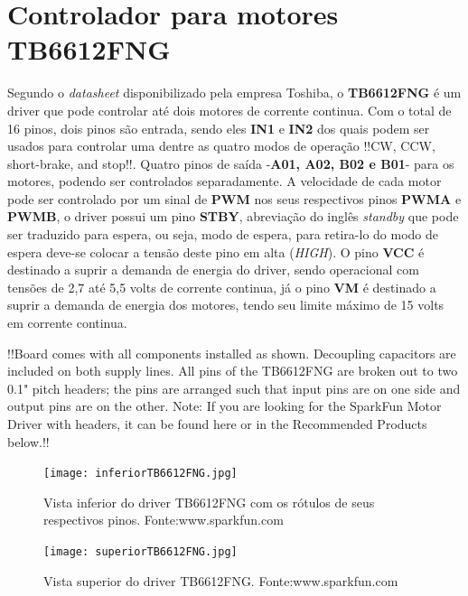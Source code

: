 \documentclass[a4paper,12pt,portuguese]{ufms-cpcx}
\begin{document}
\section{Controlador para motores TB6612FNG}\label{TB6612FNG}
Segundo o \textit{datasheet} disponibilizado pela empresa Toshiba, o \textbf{TB6612FNG} é um driver que pode controlar até dois motores de corrente continua. Com o total de 16 pinos, dois pinos são entrada, sendo eles \textbf{IN1} e \textbf{IN2} dos quais podem ser usados para controlar uma dentre as quatro modos de operação !!CW, CCW, short-brake, and stop!!. Quatro pinos de saída -\textbf{A01, A02, B02 e B01}- para os motores, podendo ser controlados separadamente. A velocidade de cada motor pode ser controlado por um sinal de \textbf{PWM} nos seus respectivos pinos \textbf{PWMA} e \textbf{PWMB}, o driver possui um pino \textbf{STBY}, abreviação do inglês \textit{standby} que pode ser traduzido para espera, ou seja, modo de espera, para retira-lo do modo de espera deve-se colocar a tensão deste pino em alta (\textit{HIGH}). O pino \textbf{VCC} é destinado a suprir a demanda de energia do driver, sendo operacional com tensões de 2,7 até 5,5 volts de corrente continua, já o pino \textbf{VM} é destinado a suprir a demanda de energia dos motores, tendo seu limite máximo de 15 volts em corrente continua. 

!!Board comes with all components installed as shown. Decoupling capacitors are included on both supply lines. All pins of the TB6612FNG are broken out to two 0.1" pitch headers; the pins are arranged such that input pins are on one side and output pins are on the other.
Note: If you are looking for the SparkFun Motor Driver with headers, it can be found here or in the Recommended Products below.!!

\begin{figure}[H]
	\centering
	\texttt{[image: inferiorTB6612FNG.jpg]}
	\caption{Vista inferior do driver TB6612FNG com os rótulos de seus respectivos pinos. Fonte:www.sparkfun.com}
\end{figure}
\begin{figure}[H]
	\centering
	\texttt{[image: superiorTB6612FNG.jpg]}
	\caption{Vista superior do driver TB6612FNG. Fonte:www.sparkfun.com}
\end{figure}
\end{document}
